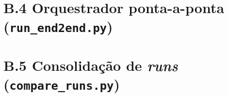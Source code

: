 

\clearpage
\section*{B.4 Orquestrador ponta-a-ponta (\texttt{run\_end2end.py})}



\clearpage
\section*{B.5 Consolidação de \emph{runs} (\texttt{compare\_runs.py})}


